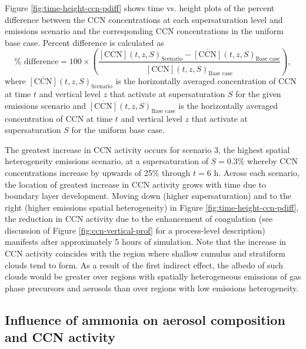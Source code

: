 \documentclass[journal abbreviation, manuscript]{copernicus}
\begin{document}
Figure \ref{fig:time-height-ccn-pdiff} shows time vs. height plots of the percent difference between the CCN concentrations at each supersaturation level and emissions scenario and the corresponding CCN concentrations in the uniform base case. Percent difference is calculated as 
\begin{equation}
    \% \text{ difference} = 100\times\left(\frac{\overline{[\text{CCN}]}(t, z, S)_{\text{Scenario}} - \overline{[\text{CCN}]}(t, z, S)_{\text{Base case}}}{\overline{[\text{CCN}]}(t, z, S)_{\text{Base case}}}\right),
\end{equation}
where $\overline{[\text{CCN}]}(t, z,S)_{\text{Scenario}}$ is the horizontally averaged concentration of CCN at time $t$ and vertical level $z$ that activate at supersaturation $S$ for the given emissions scenario and $\overline{[\text{CCN}]}(t, z, S)_{\text{Base case}}$ is the horizontally averaged concentration of CCN at time $t$ and vertical level $z$ that activate at supersaturation $S$ for the uniform base case. 

The greatest increase in CCN activity occurs for scenario 3, the highest spatial heterogeneity emissions scenario, at a supersaturation of $S=0.3\%$ whereby CCN concentrations increase by upwards of 25\% through $t=6$ h. Across each scenario, the location of greatest increase in CCN activity grows with time due to boundary layer development. Moving down (higher supersaturation) and to the right (higher emissions spatial heterogeneity) in Figure \ref{fig:time-height-ccn-pdiff}, the reduction in CCN activity due to the enhancement of coagulation (see discussion of Figure \ref{fig:ccn-vertical-prof} for a process-level description) manifests after approximately 5 hours of simulation. Note that the increase in CCN activity coincides with the region where shallow cumulus and stratiform clouds tend to form. As a result of the first indirect effect, the albedo of such clouds would be greater over regions with spatially heterogeneous emissions of gas phase precursors and aerosols than over regions with low emissions heterogeneity.  



\subsection{Influence of ammonia on aerosol composition and CCN activity}\label{sec:influence-ammonia}
\end{document}
